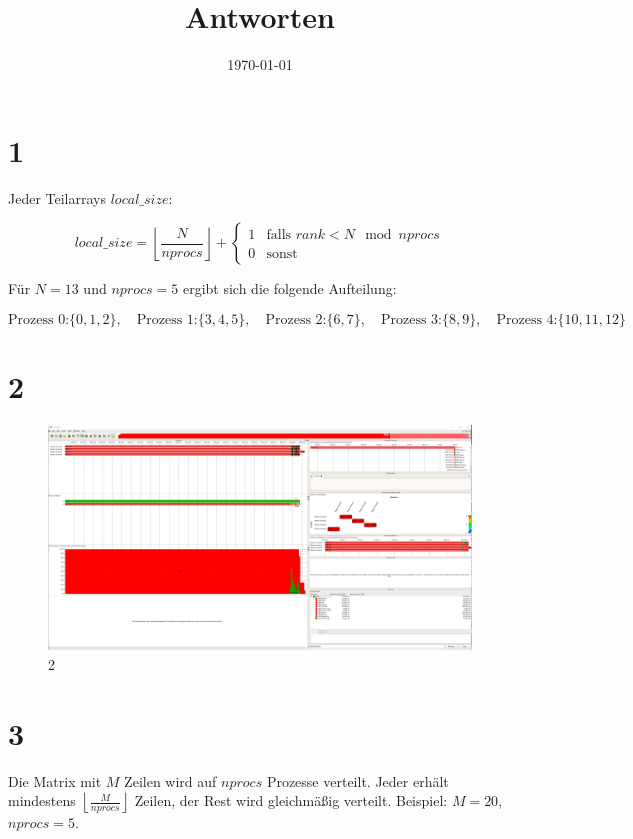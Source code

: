 \documentclass[a4paper,12pt]{article}
\title{Antworten}
\date{\today}
\begin{document}
\maketitle

\section*{1}

Jeder Teilarrays \( local\_size \):

\[
local\_size = \left\lfloor \frac{N}{nprocs} \right\rfloor + \left\{
\begin{array}{ll}
1 & \text{falls } rank < N \mod nprocs \\
0 & \text{sonst}
\end{array}
\right.
\]

Für \( N = 13 \) und \( nprocs = 5 \) ergibt sich die folgende Aufteilung:

\[
\text{Prozess 0:} \{0, 1, 2\}, \quad \text{Prozess 1:} \{3, 4, 5\}, \quad \text{Prozess 2:} \{6, 7\}, \quad \text{Prozess 3:} \{8, 9\}, \quad \text{Prozess 4:} \{10, 11, 12\}
\]


\section*{2}

\begin{figure}[H]
    \centering
    \includegraphics[width=1.1\linewidth]{Bild_2024-12-07_164331586.png}
    \caption{2}
    \label{fig:enter-label}
\end{figure}

\section*{3}

Die Matrix mit \( M \) Zeilen wird auf \( nprocs \) Prozesse verteilt. Jeder erhält mindestens \( \left\lfloor \frac{M}{nprocs} \right\rfloor \) Zeilen, der Rest wird gleichmäßig verteilt. Beispiel: \( M = 20 \), \( nprocs = 5 \).
\end{document}
